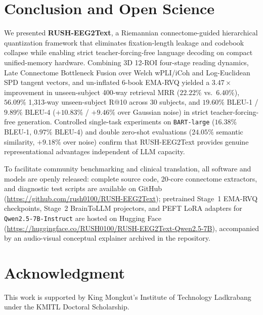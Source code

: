 \documentclass[journal]{IEEEtran}
\begin{document}
\section{Conclusion and Open Science}
We presented \textbf{RUSH-EEG2Text}, a Riemannian connectome-guided hierarchical quantization framework that eliminates fixation-length leakage and codebook collapse while enabling strict teacher-forcing-free language decoding on compact unified-memory hardware. Combining 3D 12-ROI four-stage reading dynamics, Late Connectome Bottleneck Fusion over Welch wPLI/iCoh and Log-Euclidean SPD tangent vectors, and un-inflated 6-book EMA-RVQ yielded a $3.47\times$ improvement in unseen-subject 400-way retrieval MRR ($22.22\%$ vs.\ $6.40\%$), $56.09\%$ 1,313-way unseen-subject R@10 across 30 subjects, and $19.60\%$ BLEU-1 / $9.89\%$ BLEU-4 ($+10.83\%$ / $+9.46\%$ over Gaussian noise) in strict teacher-forcing-free generation. Controlled single-task experiments on \texttt{BART-large} ($16.38\%$ BLEU-1, $0.97\%$ BLEU-4) and double zero-shot evaluations ($24.05\%$ semantic similarity, $+9.18\%$ over noise) confirm that RUSH-EEG2Text provides genuine representational advantages independent of LLM capacity.

To facilitate community benchmarking and clinical translation, all software and models are openly released: complete source code, 20-core connectome extractors, and diagnostic test scripts are available on GitHub (\url{https://github.com/rush0100/RUSH-EEG2Text}); pretrained Stage~1 EMA-RVQ checkpoints, Stage~2 BrainToLLM projectors, and PEFT LoRA adapters for \texttt{Qwen2.5-7B-Instruct} are hosted on Hugging Face (\url{https://huggingface.co/RUSH0100/RUSH-EEG2Text-Qwen2.5-7B}), accompanied by an audio-visual conceptual explainer archived in the repository.

\section*{Acknowledgment}
This work is supported by King Mongkut's Institute of Technology Ladkrabang under the KMITL Doctoral Scholarship.

\balance
{\small


}
\end{document}
